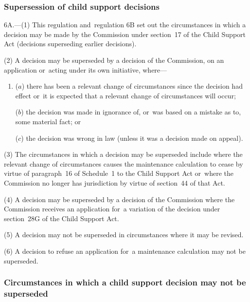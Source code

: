 \documentclass[12pt,a4paper]{article}
\begin{document}
{%

\subsubsection[6A. Supersession of child support decisions]{Supersession of child support decisions}

6A.---(1)  This regulation and~regulation 6B set out the circumstances in which a decision may be made by the Commission under section~17 of the Child Support Act (decisions superseding earlier decisions).

(2) A decision may be superseded by a decision of the Commission, on an application or~acting under its own initiative, where—
\begin{enumerate}\item[]
($a$) there has been a relevant change of circumstances since the decision had effect or~it is expected that a relevant change of circumstances will occur;

($b$) the decision was made in ignorance of, or~was based on a mistake as to, some material fact; or

($c$) the decision was wrong in law (unless it was a decision made on appeal).
\end{enumerate}

(3) The circumstances in which a decision may be superseded include where the relevant change of circumstances causes the maintenance calculation to cease by virtue of paragraph~16 of Schedule~1 to the Child Support Act or~where the Commission no longer has jurisdiction by virtue of section~44 of that Act.

(4) A decision may be superseded by a decision of the Commission where the Commission receives an application for~a variation of the decision under section~28G of the Child Support Act.

(5) A decision may not be superseded in circumstances where it may be revised.

(6) A decision to refuse an application for~a maintenance calculation may not be superseded.


\subsubsection[6B. Circumstances in which a child support decision may not be superseded]{Circumstances in which a child support decision may not be superseded}

}
\end{document}
